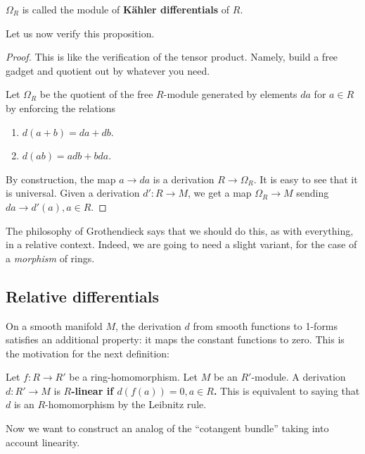 \begin{definition} 
$\Omega_R$ is called the module of \textbf{K\"ahler differentials} of $R$.
\end{definition} 

Let us now verify this proposition.
\begin{proof} 
This is like the verification of the tensor product. Namely, build a free
gadget and quotient out by whatever you need.

Let $\Omega_R$ be the quotient of the free $R$-module generated by elements
$da$ for $a \in R$ by enforcing the relations
\begin{enumerate}
\item $d(a+b) =da + db$. 
\item $d(ab) = adb + bda$.
\end{enumerate}
By construction, the map $a \to da$ is a derivation $R \to \Omega_R$. 
It is easy to see that it is universal. Given a derivation $d': R \to M$, we get a
map $\Omega_R \to M$ sending $da \to d'(a), a \in R$.
\end{proof} 

The philosophy of Grothendieck says that we should do this, as with everything,
in a relative context.
Indeed, we are going to need a slight variant, for the case of a \emph{morphism} of
rings.

\subsection{Relative differentials}

On a smooth manifold $M$, the derivation $d$ from smooth functions to 1-forms
satisfies an additional property: it maps the constant functions to zero. 
This is the motivation for the next definition:

\begin{definition} 
Let $f: R \to R'$ be a ring-homomorphism. Let $M$ be an $R'$-module. A
derivation $d: R' \to M$ is \textbf{$R$-linear if $d(f(a)) = 0, a \in R$.}
This is equivalent to saying that $d$ is an $R$-homomorphism by the Leibnitz
rule.
\end{definition} 

Now we want to construct an analog of the ``cotangent bundle'' taking into
account linearity. 

